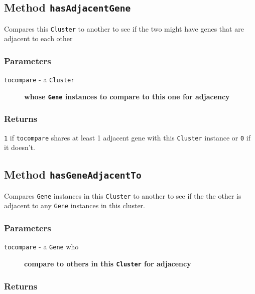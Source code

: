 \subsection*{Method \texttt{hasAdjacentGene}\label{Method_hasAdjacentGene}}


Compares this \texttt{Cluster} to another to see if the two might have genes that 
are adjacent to each other

\subsubsection*{Parameters\label{Parameters}}
\begin{description}

\item[{\texttt{tocompare} - a \texttt{Cluster}}] \textbf{whose \texttt{Gene} instances to compare to this one for adjacency}\end{description}
\subsubsection*{Returns\label{Returns}}


\texttt{1} if \texttt{tocompare} shares at least 1 adjacent gene with this \texttt{Cluster} instance or
\texttt{0} if it doesn't.

\subsection*{Method \texttt{hasGeneAdjacentTo}\label{Method_hasGeneAdjacentTo}}


Compares \texttt{Gene} instances in this \texttt{Cluster} to another to see if the the other 
is adjacent to any \texttt{Gene} instances in this cluster.

\subsubsection*{Parameters\label{Parameters}}
\begin{description}

\item[{\texttt{tocompare} - a \texttt{Gene} who}] \textbf{compare to others in this \texttt{Cluster} for adjacency}\end{description}
\subsubsection*{Returns\label{Returns}}



